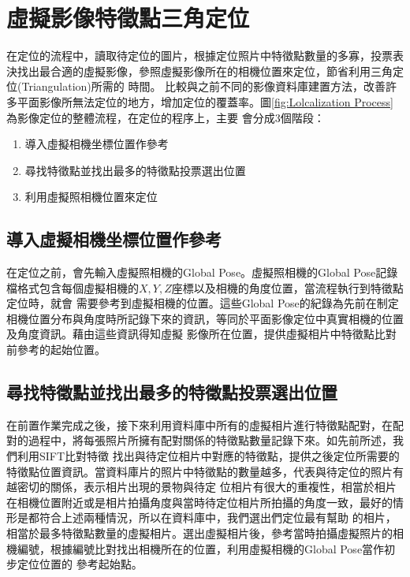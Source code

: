 \section{虛擬影像特徵點三角定位}

	在定位的流程中，讀取待定位的圖片，根據定位照片中特徵點數量的多寡，投票表決找出最合適的虛擬影像，參照虛擬影像所在的相機位置來定位，節省利用三角定位(Triangulation)所需的
	時間。
	比較與之前不同的影像資料庫建置方法，改善許多平面影像所無法定位的地方，增加定位的覆蓋率。圖\ref{fig:Lolcalization Process}為影像定位的整體流程，在定位的程序上，主要
	會分成3個階段：
		\begin{enumerate}
			\item 導入虛擬相機坐標位置作參考
    		\item 尋找特徵點並找出最多的特徵點投票選出位置
    		\item 利用虛擬照相機位置來定位
		\end{enumerate} 
		
\subsection{導入虛擬相機坐標位置作參考}	

	在定位之前，會先輸入虛擬照相機的Global Pose。虛擬照相機的Global Pose記錄檔格式包含每個虛擬相機的$X,Y,Z$座標以及相機的角度位置，當流程執行到特徵點定位時，就會
	需要參考到虛擬相機的位置。這些Global Pose的紀錄為先前在制定相機位置分布與角度時所記錄下來的資訊，等同於平面影像定位中真實相機的位置及角度資訊。藉由這些資訊得知虛擬
	影像所在位置，提供虛擬相片中特徵點比對前參考的起始位置。
		
\subsection{尋找特徵點並找出最多的特徵點投票選出位置}	

	在前置作業完成之後，接下來利用資料庫中所有的虛擬相片進行特徵點配對，在配對的過程中，將每張照片所擁有配對關係的特徵點數量記錄下來。如先前所述，我們利用SIFT比對特徵
	找出與待定位相片中對應的特徵點，提供之後定位所需要的特徵點位置資訊。當資料庫片的照片中特徵點的數量越多，代表與待定位的照片有越密切的關係，表示相片出現的景物與待定
	位相片有很大的重複性，相當於相片在相機位置附近或是相片拍攝角度與當時待定位相片所拍攝的角度一致，最好的情形是都符合上述兩種情況，所以在資料庫中，我們選出們定位最有幫助
	的相片，相當於最多特徵點數量的虛擬相片。選出虛擬相片後，參考當時拍攝虛擬照片的相機編號，根據編號比對找出相機所在的位置，利用虛擬相機的Global Pose當作初步定位位置的
	參考起始點。
	
